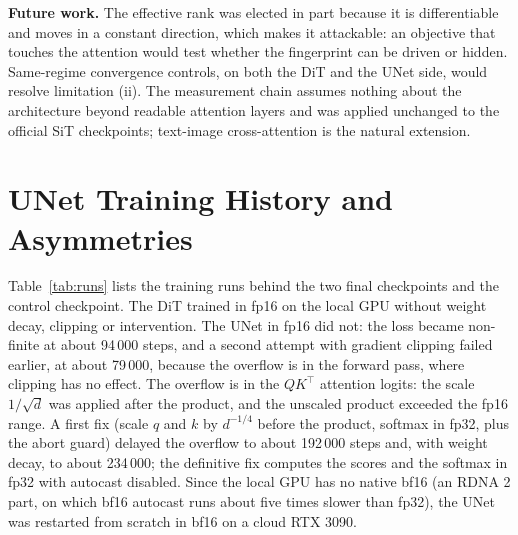 \documentclass{article}
\begin{document}
\textbf{Future work.} The effective rank was elected in part because it is differentiable and moves in a constant direction, which makes it attackable: an objective that touches the attention would test whether the fingerprint can be driven or hidden. Same-regime convergence controls, on both the DiT and the UNet side, would resolve limitation (ii). The measurement chain assumes nothing about the architecture beyond readable attention layers and was applied unchanged to the official SiT checkpoints; text-image cross-attention is the natural extension.




\clearpage
\appendix

\section{UNet Training History and Asymmetries}\label{app:training}

Table~\ref{tab:runs} lists the training runs behind the two final checkpoints and the control checkpoint. The DiT trained in fp16 on the local GPU without weight decay, clipping or intervention. The UNet in fp16 did not: the loss became non-finite at about 94\,000 steps, and a second attempt with gradient clipping failed earlier, at about 79\,000, because the overflow is in the forward pass, where clipping has no effect. The overflow is in the $QK^\top$ attention logits: the scale $1/\sqrt{d}$ was applied after the product, and the unscaled product exceeded the fp16 range. A first fix (scale $q$ and $k$ by $d^{-1/4}$ before the product, softmax in fp32, plus the abort guard) delayed the overflow to about 192\,000 steps and, with weight decay, to about 234\,000; the definitive fix computes the scores and the softmax in fp32 with autocast disabled. Since the local GPU has no native bf16 (an RDNA 2 part, on which bf16 autocast runs about five times slower than fp32), the UNet was restarted from scratch in bf16 on a cloud RTX 3090.
\end{document}
